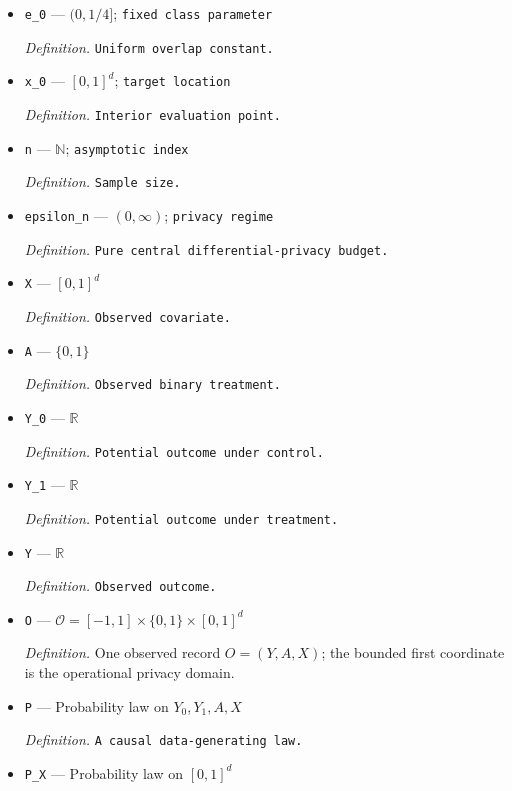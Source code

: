 \documentclass{article}
\begin{document}
\begin{itemize}
  \item \texttt{e\_\allowbreak{}0} --- \((0,1/4]\); \texttt{fixed class parameter}
  \par\smallskip\noindent\emph{Definition.} \texttt{Uniform overlap constant.}
  \item \texttt{x\_\allowbreak{}0} --- \([0,1]^d\); \texttt{target location}
  \par\smallskip\noindent\emph{Definition.} \texttt{Interior evaluation point.}
  \item \texttt{n} --- \(\mathbb N\); \texttt{asymptotic index}
  \par\smallskip\noindent\emph{Definition.} \texttt{Sample size.}
  \item \texttt{epsilon\_\allowbreak{}n} --- \((0,\infty)\); \texttt{privacy regime}
  \par\smallskip\noindent\emph{Definition.} \texttt{Pure central differential-\allowbreak{}privacy budget.}
  \item \texttt{X} --- \([0,1]^d\)
  \par\smallskip\noindent\emph{Definition.} \texttt{Observed covariate.}
  \item \texttt{A} --- \(\{0,1\}\)
  \par\smallskip\noindent\emph{Definition.} \texttt{Observed binary treatment.}
  \item \texttt{Y\_\allowbreak{}0} --- \(\mathbb R\)
  \par\smallskip\noindent\emph{Definition.} \texttt{Potential outcome under control.}
  \item \texttt{Y\_\allowbreak{}1} --- \(\mathbb R\)
  \par\smallskip\noindent\emph{Definition.} \texttt{Potential outcome under treatment.}
  \item \texttt{Y} --- \(\mathbb R\)
  \par\smallskip\noindent\emph{Definition.} \texttt{Observed outcome.}
  \item \texttt{O} --- \(\mathcal O=[-1,1]\times\{0,1\}\times[0,1]^d\)
  \par\smallskip\noindent\emph{Definition.} One observed record \(O=(Y,A,X)\); the bounded first coordinate is the operational privacy domain.
  \item \texttt{P} --- Probability law on \(Y_0,Y_1,A,X\)
  \par\smallskip\noindent\emph{Definition.} \texttt{A causal data-\allowbreak{}generating law.}
  \item \texttt{P\_\allowbreak{}X} --- Probability law on \([0,1]^d\)

\end{itemize}
\end{document}
